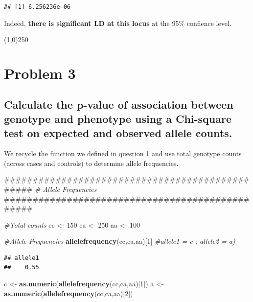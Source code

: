 \documentclass[]{article}
\newenvironment{Shaded}{\begin{snugshade}}{\end{snugshade}}
\newcommand{\KeywordTok}[1]{\textcolor[rgb]{0.13,0.29,0.53}{\textbf{{#1}}}}
\newcommand{\DecValTok}[1]{\textcolor[rgb]{0.00,0.00,0.81}{{#1}}}
\newcommand{\StringTok}[1]{\textcolor[rgb]{0.31,0.60,0.02}{{#1}}}
\newcommand{\CommentTok}[1]{\textcolor[rgb]{0.56,0.35,0.01}{\textit{{#1}}}}
\newcommand{\NormalTok}[1]{{#1}}
\begin{document}
\begin{verbatim}
## [1] 6.256236e-06
\end{verbatim}

Indeed, \textbf{there is significant LD at this locus} at the 95\%
confience level.

\begin{center}
\line(1,0){250}
\end{center}

\pagebreak

\section{Problem 3}\label{problem-3}

\subsection{Calculate the p-value of association between genotype and
phenotype using a Chi-square test on expected and observed allele
counts.}\label{calculate-the-p-value-of-association-between-genotype-and-phenotype-using-a-chi-square-test-on-expected-and-observed-allele-counts.}

We recycle the function we defined in question 1 and use total genotype
counts (across cases and controls) to determine allele frequencies.

\begin{Shaded}
\begin{Highlighting}[]
\NormalTok{################################################}
\CommentTok{# Allele Frequencies}
\NormalTok{################################################}

\CommentTok{#Total counts}
\NormalTok{cc <-}\StringTok{ }\DecValTok{150}
\NormalTok{ca <-}\StringTok{ }\DecValTok{250}
\NormalTok{aa <-}\StringTok{ }\DecValTok{100}

\CommentTok{#Allele Frequencies}
\KeywordTok{allelefrequency}\NormalTok{(cc,ca,aa)[}\DecValTok{1}\NormalTok{] }\CommentTok{#allele1 = c ; allele2 = a)}
\end{Highlighting}
\end{Shaded}

\begin{verbatim}
## allele1 
##    0.55
\end{verbatim}

\begin{Shaded}
\begin{Highlighting}[]
\NormalTok{c <-}\StringTok{ }\KeywordTok{as.numeric}\NormalTok{(}\KeywordTok{allelefrequency}\NormalTok{(cc,ca,aa)[}\DecValTok{1}\NormalTok{])}
\NormalTok{a <-}\StringTok{ }\KeywordTok{as.numeric}\NormalTok{(}\KeywordTok{allelefrequency}\NormalTok{(cc,ca,aa)[}\DecValTok{2}\NormalTok{])}
\end{Highlighting}
\end{Shaded}
\end{document}
